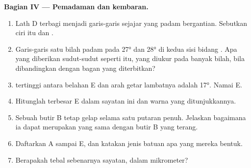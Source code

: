 \begin{problem}
\medskip
\noindent\textbf{Bagian IV --- Pemadaman dan kembaran.}
\begin{enumerate}[resume]
  \item Lath D terbagi menjadi garis-garis sejajar yang padam bergantian. Sebutkan ciri itu dan .
  \item Garis-garis satu bilah padam pada \ang{27} dan \ang{28} di kedua sisi bidang . Apa yang diberikan sudut-sudut seperti itu, yang diukur pada banyak bilah, bila dibandingkan dengan bagan yang diterbitkan?
  \item {} tertinggi antara belahan E dan arah getar lambatnya adalah \ang{17}. Namai E.
  \item Hitunglah  terbesar E dalam sayatan ini dan warna yang ditunjukkannya.
  \item Sebuah butir B tetap gelap selama satu putaran penuh. Jelaskan bagaimana ia dapat merupakan  yang sama dengan butir B yang terang.
  \item Daftarkan  A sampai E, dan katakan jenis batuan apa yang mereka bentuk.
  \item Berapakah tebal sebenarnya sayatan, dalam mikrometer?
\end{enumerate}
\end{problem}
